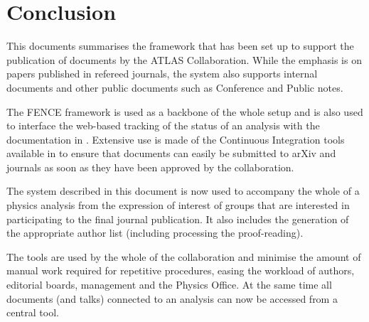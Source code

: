 
\section{Conclusion}
\label{sec:Conclusion}

This documents summarises the framework that has been set up to support
the publication of documents by the ATLAS Collaboration.
While the emphasis is on papers published in refereed journals,
the system also supports internal documents and other public documents
such as Conference and Public notes.

The FENCE framework is used as a backbone of the whole setup
and is also used to interface the web-based tracking of the status of
an analysis with the documentation in \gitlab.
Extensive use is made of the Continuous Integration tools available in \gitlab
to ensure that documents can easily be submitted to arXiv and journals
as soon as they have been approved by the collaboration.

The system described in this document is now used to accompany
the whole of a physics analysis from the expression of interest of groups
that are interested in participating to the final journal publication.
It also includes the generation of the appropriate author list 
(including processing the proof-reading).

The tools are used by the whole of the collaboration and
minimise the amount of manual work required for repetitive procedures,
easing the workload of authors, editorial boards, management and the Physics Office.
At the same time all documents (and talks) connected to an analysis can now be accessed
from a central tool.
